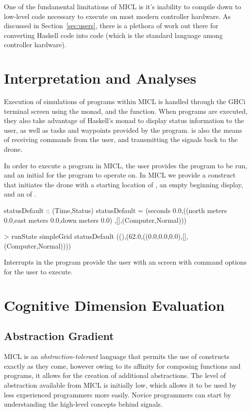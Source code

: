 \documentclass[11pt]{article}
\begin{document}
One of the fundamental limitations of MICL is it's inability to compile down
to low-level code necessary to execute on most modern controller hardware. As
discussed in Section~\ref{sec:users}, there is a plethora of work out there
for converting Haskell code into  code (which is the standard language
among controller hardware).


\section{Interpretation and Analyses}
\label{sec:analysis}
Execution of simulations of programs within MICL is handled through the GHCi
terminal screen using the  monad, and the 
function. When programs are executed, they also take advantage of Haskell's
 monad to display status information to the user, as well as tasks
and waypoints provided by the program.  is also the means of
receiving commands from the user, and transmitting the signals back to the
drone.

In order to execute a program in MICL, the user provides the program to be
run, and an initial  for the program to operate on. In MICL we
provide a  construct that initiates the drone with a
starting location of , an empty beginning
display, and an  of .

\begin{program}
statusDefault :: (Time,Status)
statusDefault = (seconds 0.0,((north meters 0.0,east meters 0.0,down meters 0.0)
                             ,[],(Computer,Normal)))

> runState simpleGrid statusDefault
((),(62.0,((0.0,0.0,0.0),[],(Computer,Normal))))
\end{program}

Interrupts in the program provide the user with an  screen with
command options for the user to execute.


\section{Cognitive Dimension Evaluation}
\label{sec:cogdim}
\subsection{Abstraction Gradient}
\label{sec:cogdim:abstr}
MICL is an \emph{abstraction-tolerant} language that permits the use of
constructs exactly as they come, however owing to its affinity for composing
functions and programs, it allows for the creation of additional
abstractions. The level of abstraction available from MICL is initially low,
which allows it to be used by less experienced programmers more easily. Novice
programmers can start by understanding the high-level concepts behind signals.
\end{document}
